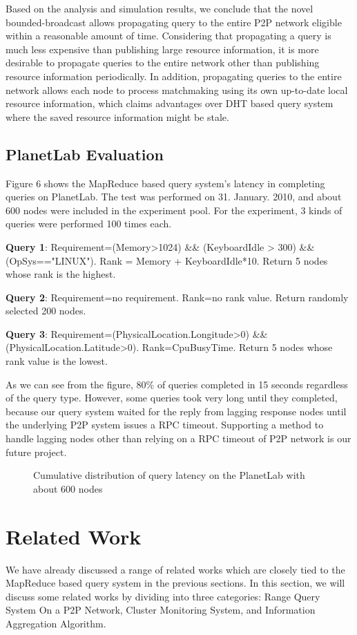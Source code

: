\documentclass{acm_proc_article-sp}
\begin{document}
Based on the analysis and simulation results, we conclude that the novel bounded-broadcast allows propagating query to the entire P2P network eligible within a reasonable amount of time.
Considering that propagating a query is much less expensive than publishing large resource information, it is more desirable to propagate queries to the entire network other than publishing resource information periodically. 
In addition, propagating queries to the entire network allows each node to process matchmaking using its own up-to-date local resource information, 
which claims advantages over DHT based query system where the saved resource information might be stale.

\subsection{PlanetLab Evaluation}
Figure 6 shows the MapReduce based query system's latency in completing queries on PlanetLab. The test was performed on 31. January. 2010, and about 600 nodes were included in the experiment pool.
For the experiment, 3 kinds of queries were performed 100 times each. 

\textbf{Query 1}: Requirement=(Memory>1024) \&\& (KeyboardIdle > 300) \&\& (OpSys=="LINUX"). Rank = Memory + KeyboardIdle*10. Return 5 nodes whose rank is the highest.

\textbf{Query 2}: Requirement=no requirement. Rank=no rank value. Return randomly selected 200 nodes. 

\textbf{Query 3}: Requirement=(PhysicalLocation.Longitude>0) \&\& (PhysicalLocation.Latitude>0). Rank=CpuBusyTime. Return 5 nodes whose rank value is the lowest.

As we can see from the figure, 80\% of queries completed in 15 seconds regardless of the query type. However, some queries took very long until they completed, 
because our query system waited for the reply from lagging response nodes until the underlying P2P system issues a RPC timeout.
Supporting a method to handle lagging nodes other than relying on a RPC timeout of P2P network is our future project.
\begin{figure}
\centering
{}
\caption{Cumulative distribution of query latency on the PlanetLab with about 600 nodes}
\end{figure}
\section{Related Work}
We have already discussed a range of related works which are closely tied to the MapReduce based query system in the previous sections. 
In this section, we will discuss some related works by dividing into three categories:
Range Query System On a P2P Network, Cluster Monitoring System, and Information Aggregation Algorithm.
\end{document}
